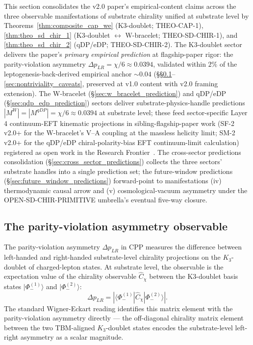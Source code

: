 \documentclass[11pt,letterpaper]{article}
\newcommand{\Kthree}{\ensuremath{K_3}}
\newcommand{\DeltapLR}{\Delta p_{LR}}
\newcommand{\Cchi}{\hat{C}_\chi}
\newcommand{\PhiminusOne}{|\Phi_-^{(1)}\rangle}
\newcommand{\PhiminusTwo}{|\Phi_-^{(2)}\rangle}
\begin{document}
This section consolidates the v2.0 paper's empirical-content claims across the three observable manifestations of substrate chirality unified at substrate level by Theorems~\ref{thm:composite_cap_we} (K3-doublet; THEO-CAP-1), \ref{thm:theo_sd_chir_1} (K3-doublet $\leftrightarrow$ W-bracelet; THEO-SD-CHIR-1), and \ref{thm:theo_sd_chir_2} (qDP/eDP; THEO-SD-CHIR-2). The K3-doublet sector delivers the paper's \emph{primary empirical prediction} at flagship-paper rigor: the parity-violation asymmetry $\DeltapLR = \chi/6 \approx 0.0394$, validated within $2\%$ of the leptogenesis-back-derived empirical anchor $\sim 0.04$ (\S\S\ref{sec:dplr_observable}--\ref{sec:nontriviality_caveats}, preserved at v1.0 content with v2.0 framing extension). The W-bracelet (\S\ref{sec:w_bracelet_prediction}) and qDP/eDP (\S\ref{sec:qdp_edp_prediction}) sectors deliver substrate-physics-handle predictions $|M^W| = |M^{qDP}| = \chi/6 \approx 0.0394$ at substrate level; these feed sector-specific Layer 4 continuum-EFT kinematic projections in sibling-flagship-paper work (SF-2 v2.0+ for the W-bracelet's V--A coupling at the massless helicity limit; SM-2 v2.0+ for the qDP/eDP chiral-polarity-bias EFT continuum-limit calculation) registered as open work in the Research Frontier~\cite{abshier_research_frontier}. The cross-sector predictions consolidation (\S\ref{sec:cross_sector_predictions}) collects the three sectors' substrate handles into a single prediction set; the future-window predictions (\S\ref{sec:future_window_predictions}) forward-point to manifestations (iv) thermodynamic causal arrow and (v) cosmological-vacuum asymmetry under the OPEN-SD-CHIR-PRIMITIVE umbrella's eventual five-way closure.

\subsection{The parity-violation asymmetry observable}\label{sec:dplr_observable}

The parity-violation asymmetry $\DeltapLR$ in CPP measures the difference between left-handed and right-handed substrate-level chirality projections on the $\Kthree$-doublet of charged-lepton states. At substrate level, the observable is the expectation value of the chirality observable $\Cchi$ between the K3-doublet basis states $\PhiminusOne$ and $\PhiminusTwo$:
\begin{equation}\label{eq:dplr_definition}
\DeltapLR = |\langle \Phi_-^{(1)} | \Cchi | \Phi_-^{(2)} \rangle|.
\end{equation}
The standard Wigner-Eckart reading identifies this matrix element with the parity-violation asymmetry directly --- the off-diagonal chirality matrix element between the two TBM-aligned $\Kthree$-doublet states encodes the substrate-level left-right asymmetry as a scalar magnitude.
\end{document}
